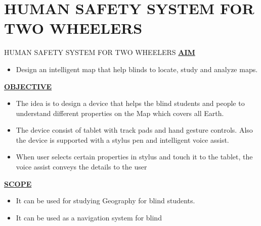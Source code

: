 \documentclass[svgnames,9pt]{beamer}
\begin{document}
\section{HUMAN SAFETY SYSTEM FOR TWO WHEELERS}
\begin{frame}{HUMAN SAFETY SYSTEM FOR TWO WHEELERS}
	\underline{\textbf{AIM}}
	\begin{itemize}
		\item Design an intelligent map that help blinds to locate, study and analyze maps.
	\end{itemize}
	\underline{\textbf{OBJECTIVE}}
	\begin{itemize}
		\item The idea is to design a device that helps the blind students and people to
		understand different properties on the Map which covers all Earth.
		\item The device consist of tablet with track pads and hand gesture controls. Also
		the device is supported with a stylus pen and intelligent voice assist.
		\item When user selects certain properties in stylus and touch it to the tablet, the
		voice assist conveys the details to the user
	\end{itemize}
	\underline{\textbf{SCOPE}}
	\begin{itemize}
		\item It can be used for studying Geography for blind students.
		\item It can be used as a navigation system for blind
	\end{itemize}
\end{frame}
\end{document}
